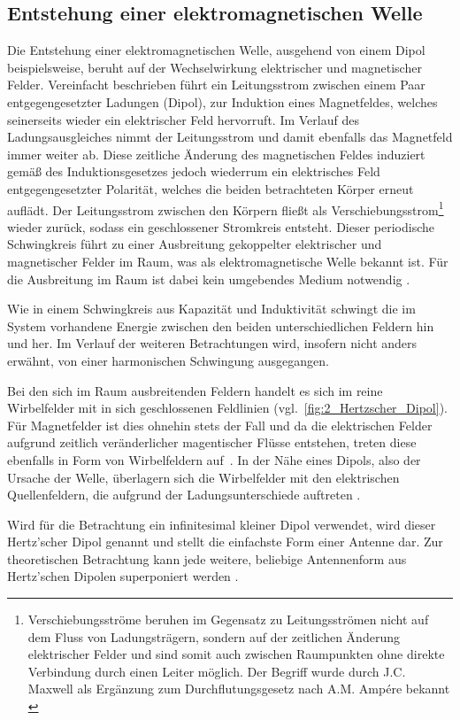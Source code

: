 
\subsection{Entstehung einer elektromagnetischen Welle}\label{cha:2_sub_Entstehung_einer_Welle}

Die Entstehung einer elektromagnetischen Welle, ausgehend von einem Dipol beispielsweise, beruht auf der Wechselwirkung elektrischer und magnetischer Felder. Vereinfacht beschrieben führt ein Leitungsstrom zwischen einem Paar entgegengesetzter Ladungen (Dipol), zur Induktion eines Magnetfeldes, welches seinerseits wieder ein elektrischer Feld hervorruft. Im Verlauf des Ladungsausgleiches nimmt der Leitungsstrom und damit ebenfalls das Magnetfeld immer weiter ab. Diese zeitliche Änderung des magnetischen Feldes induziert gemäß des Induktionsgesetzes jedoch wiederrum ein elektrisches Feld entgegengesetzter Polarität, welches die beiden betrachteten Körper erneut auflädt. Der Leitungsstrom zwischen den Körpern fließt als Verschiebungsstrom\footnote{Verschiebungsströme beruhen im Gegensatz zu Leitungsströmen nicht auf dem Fluss von Ladungsträgern, sondern auf der zeitlichen Änderung elektrischer Felder und sind somit auch zwischen Raumpunkten ohne direkte Verbindung durch einen Leiter möglich. Der Begriff wurde durch J.C. Maxwell als Ergänzung zum Durchflutungsgesetz nach A.M. Ampére bekannt \cite{Feldtheorie_Begriffe}} wieder zurück, sodass ein geschlossener Stromkreis entsteht. Dieser periodische Schwingkreis führt zu einer Ausbreitung gekoppelter elektrischer und magnetischer Felder im Raum, was als elektromagnetische Welle bekannt ist. Für die Ausbreitung im Raum ist dabei kein umgebendes Medium notwendig \cite{EM_Schirmung}.
\par
\vspace{\linespace}
Wie in einem Schwingkreis aus Kapazität und Induktivität schwingt die im System vorhandene Energie zwischen den beiden unterschiedlichen Feldern hin und her. Im Verlauf der weiteren Betrachtungen wird, insofern nicht anders erwähnt, von einer harmonischen Schwingung ausgegangen.
\par
\vspace{\linespace}
Bei den sich im Raum ausbreitenden Feldern handelt es sich im reine Wirbelfelder mit in sich geschlossenen Feldlinien \cite{Feldtheorie_Begriffe} (vgl.~\Abb \ref{fig:2_Hertzscher_Dipol}). Für Magnetfelder ist dies ohnehin stets der Fall und da die elektrischen Felder aufgrund zeitlich veränderlicher magentischer Flüsse entstehen, treten diese ebenfalls in Form von Wirbelfeldern auf~\cite{EM_Schirmung, Feldtheorie_Begriffe}. In der Nähe eines Dipols, also der Ursache der Welle, überlagern sich die Wirbelfelder mit den elektrischen Quellenfeldern, die aufgrund der Ladungsunterschiede auftreten \cite{EM_Schirmung}. 
\par
\vspace{\linespace}
Wird für die Betrachtung ein infinitesimal kleiner Dipol verwendet, wird dieser Hertz'scher Dipol genannt und stellt die einfachste Form einer Antenne dar. Zur theoretischen Betrachtung kann jede weitere, beliebige Antennenform aus Hertz'schen Dipolen superponiert werden \cite{EM_Schirmung}.

